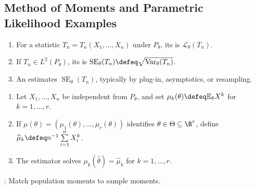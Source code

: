\subsection{Method of Moments and Parametric Likelihood Examples}

\begin{definition} \label{def:sampling-distribution-and-standard-error} 
\begin{enumerate}[label=(\roman*)]
\setlength{\itemsep}{0pt}
\item For a statistic $T_n=T_n(X_1,\ldots,X_n)$ under $P_\theta$, its  is $\mathcal{L}_\theta(T_n)$.
\item If $T_n\in L^2(P_\theta)$, its  is $\operatorname{SE}_\theta(T_n)\defeq\sqrt{\operatorname{Var}_\theta(T_n)}$.
\item An  estimates $\operatorname{SE}_\theta(T_n)$, typically by plug-in, asymptotics, or resampling.
\end{enumerate}
\end{definition}

\begin{method} \label{meth:method-of-moments} 
\begin{enumerate}[label=(\roman*)]
\setlength{\itemsep}{0pt}
\item Let $X_1,\ldots,X_n$ be independent from $P_\theta$, and set $\mu_k(\theta)\defeq\mathbb{E}_\theta X^k$ for $k=1,\ldots,r$.
\item If $\mu(\theta)=(\mu_1(\theta),\ldots,\mu_r(\theta))$ identifies $\theta\in\Theta\subseteq\R^r$, define $\widehat{\mu}_k\defeq n^{-1}\sum\limits_{i=1}^{n}X_i^k$.
\item The  estimator solves $\mu_k(\widehat{\theta})=\widehat{\mu}_k$ for $k=1,\ldots,r$.
\end{enumerate}
: Match population moments to sample moments.
\end{method}

